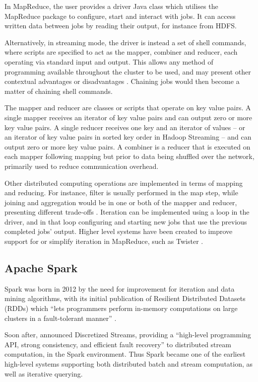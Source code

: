   In MapReduce, the user provides a driver Java class which utilises the MapReduce package to configure, start and interact with jobs. It can access written data between jobs by reading their output, for instance from HDFS.
  
  Alternatively, in streaming mode, the driver is instead a set of shell commands, where scripts are specified to act as the mapper, combiner and reducer, each operating via standard input and output. This allows any method of programming available throughout the cluster to be used, and may present other contextual advantages or disadvantages \cite{DING:HADOOP_STREAMING:2013}. Chaining jobs would then become a matter of chaining shell commands.
  
  The mapper and reducer are classes or scripts that operate on key value pairs. A single mapper receives an iterator of key value pairs and can output zero or more key value pairs. A single reducer receives one key and an iterator of values -- or an iterator of key value pairs in sorted key order in Hadoop Streaming -- and can output zero or more key value pairs. A combiner is a reducer that is executed on each mapper following mapping but prior to data being shuffled over the network, primarily used to reduce communication overhead.
  
  Other distributed computing operations are implemented in terms of mapping and reducing. For instance, filter is usually performed in the map step, while joining and aggregation would be in one or both of the mapper and reducer, presenting different trade-offs \cite{BLANAS:MR_JOINS:2010}. Iteration can be implemented using a loop in the driver, and in that loop configuring and starting new jobs that use the previous completed jobs' output. Higher level systems have been created to improve support for or simplify iteration in MapReduce, such as Twister \cite{EKANAYAKE:TWISTER:2010}.


\subsection{Apache Spark}

  Spark was born in 2012 by the need for improvement for iteration and data mining algorithms, with its initial publication of Resilient Distributed Datasets (RDDs) which ``lets programmers perform in-memory computations on large clusters in a fault-tolerant manner'' \cite{ZAHARIA:RDD:2012}.

  Soon after, \citeauthor{ZAHARIA:DSTREAM:2012} announced Discretized Streams, providing a ``high-level programming API, strong consistency, and efficient fault recovery'' to distributed stream computation, in the Spark environment. Thus Spark became one of the earliest high-level systems supporting both distributed batch and stream computation, as well as iterative querying.

